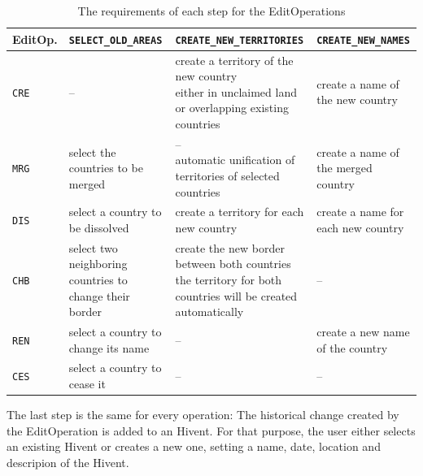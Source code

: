 \begin{table}[H]
\begin{center}
\begin{tabular}{m{0.9cm} m{4.0cm} m{4.4cm} m{3.8cm}}
  \toprule

  EditOp. &
  \texttt{SELECT\_OLD\_AREAS} &
  \texttt{CREATE\_NEW\_TERRITORIES} &
  \texttt{CREATE\_NEW\_NAMES} \\

  \midrule
  \texttt{CRE} &
  -- &
  \pbox{4.4cm}{create a territory of the new country\\
  \footnotesize{either in unclaimed land or overlapping existing countries}} &
  create a name of the new country \\

  \midrule
  \texttt{MRG} &
  select the countries to be merged &
  \pbox{4.4cm}{--\\
  \footnotesize{automatic unification of territories of selected countries}} &
  create a name of the merged country
  \\

  \midrule
  \texttt{DIS} &
  select a country to be \mbox{dissolved} &
  create a territory for each new country &
  create a name for each new country \\

  \midrule
  \texttt{CHB} &
  select two neighboring countries to change their border &
  \pbox{4.4cm}{create the new border between both countries \\
  \footnotesize{the territory for both countries will be created automatically}}  &
  -- \\

  \midrule
  \texttt{REN} &
  select a country to change its name &
  -- &
  create a new name of the country \\

  \midrule
  \texttt{CES} &
  select a country to cease it &
  -- &
  -- \\

  \bottomrule
\end{tabular}
\caption{The requirements of each step for the EditOperations}
\label{tab:editoperations_in_worklow}
\end{center}
\end{table}

The last step is the same for every operation: The historical change created by the EditOperation is added to an Hivent. For that purpose, the user either selects an existing Hivent or creates a new one, setting a name, date, location and descripion of the Hivent.

